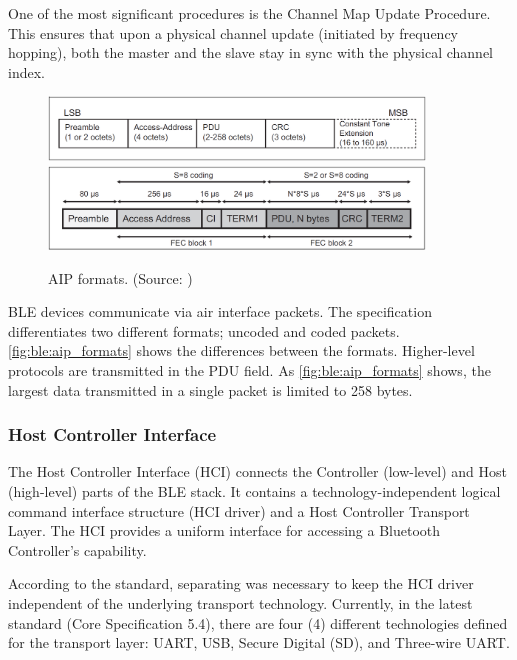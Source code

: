 One of the most significant procedures is the Channel Map Update Procedure.
This ensures that upon a physical channel update (initiated by
frequency hopping), both the master and the slave stay in sync
with the physical channel index.

\begin{figure}
    \centering
    \includegraphics[width=100mm, keepaspectratio]{figures/ble_aip_uncoded.png}\\\vspace{5mm}
    \includegraphics[width=100mm, keepaspectratio]{figures/ble_aip_coded.png}
    \caption{AIP formats. (Source: \cite{bt52})}
    \label{fig:ble:aip_formats}
\end{figure}

BLE devices communicate via air interface packets.
The specification differentiates two different formats; uncoded and coded packets.
\autoref{fig:ble:aip_formats} shows the differences between the formats.
Higher-level protocols are transmitted in the PDU field.
As \autoref{fig:ble:aip_formats} shows, the largest data transmitted in a single packet is limited to 258 bytes.

\subsubsection{Host Controller Interface}
\label{ble:hci}
The Host Controller Interface (HCI) connects the Controller (low-level) and Host (high-level) parts of the BLE stack.
It contains a technology-independent logical command interface structure (HCI driver) and a Host Controller Transport Layer.
The HCI provides a uniform interface for accessing a Bluetooth Controller's capability.

According to the standard, separating was necessary to keep the HCI driver independent of the underlying transport technology.
Currently, in the latest standard (Core Specification 5.4), there are four (4) different technologies defined for the transport layer:
UART, USB, Secure Digital (SD), and Three-wire UART.

